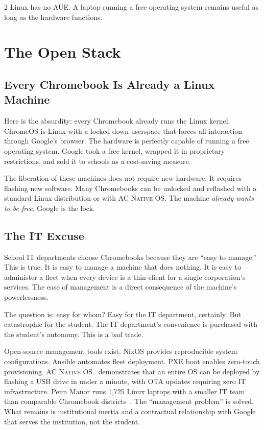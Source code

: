 \documentclass[11pt, a4paper]{article}
\newcommand{\acos}{\textsc{AC Native OS}}
\begin{document}
\begin{multicols}{2}
Linux has no AUE. A laptop running a free operating system remains useful as long as the hardware functions.


\section{The Open Stack}

\subsection{Every Chromebook Is Already a Linux Machine}

Here is the absurdity: every Chromebook already runs the Linux kernel. ChromeOS is Linux with a locked-down userspace that forces all interaction through Google's browser. The hardware is perfectly capable of running a free operating system. Google took a free kernel, wrapped it in proprietary restrictions, and sold it to schools as a cost-saving measure.

The liberation of these machines does not require new hardware. It requires flashing new software. Many Chromebooks can be unlocked and reflashed with a standard Linux distribution or with \acos{}. The machine \emph{already wants to be free}. Google is the lock.

\subsection{The IT Excuse}

School IT departments choose Chromebooks because they are ``easy to manage.'' This is true. It is easy to manage a machine that does nothing. It is easy to administer a fleet when every device is a thin client for a single corporation's services. The ease of management is a direct consequence of the machine's powerlessness.

The question is: easy for whom? Easy for the IT department, certainly. But catastrophic for the student. The IT department's convenience is purchased with the student's autonomy. This is a bad trade.

Open-source management tools exist. NixOS provides reproducible system configurations. Ansible automates fleet deployment. PXE boot enables zero-touch provisioning. \acos{}~\citep{scudder2026acos} demonstrates that an entire OS can be deployed by flashing a USB drive in under a minute, with OTA updates requiring zero IT infrastructure. Penn Manor runs 1,725 Linux laptops with a smaller IT team than comparable Chromebook districts~\citep{pennmanor2024linux}. The ``management problem'' is solved. What remains is institutional inertia and a contractual relationship with Google that serves the institution, not the student.


\end{multicols}
\end{document}
